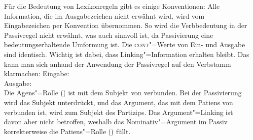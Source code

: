 Für die Bedeutung von Lexikonregeln gibt es einige Konventionen: Alle Information, 
die im Ausgabezeichen nicht erwähnt wird, wird vom Eingabezeichen per Konvention übernommen.
So wird \zb die Verbbedeutung in der Passivregel nicht erwähnt, was auch sinnvoll ist,
da Passivierung eine bedeutungserhaltende Umformung ist. Die \textsc{cont}"=Werte von Ein- und Ausgabe sind identisch.
Wichtig ist dabei, dass Linking"=Information erhalten bleibt. Das kann man sich anhand der Anwendung
der Passivregel auf den Verbstamm  klarmachen:
\eal
\label{lr-passiv-beispiel}
\ex Eingabe:\\
\ex Ausgabe:\\
\zl
Die Agens"=Rolle (\argone) ist mit dem Subjekt von  verbunden. Bei der Passivierung wird
das Subjekt unterdrückt, und das Argument, das mit dem Patiens von  verbunden
ist, wird zum Subjekt des Partizips. Das Argument"=Linking ist davon aber nicht betroffen,
weshalb das Nominativ"=Argument im Passiv korrekterweise die Patiens"=Rolle (\argtwo) füllt.

